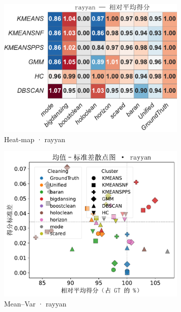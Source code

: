 \documentclass[10pt]{article} %
\numberwithin{equation}{section}
\begin{document}
\begin{figure}[htbp]
  \vspace{0.6em}
  \begin{subfigure}{0.33\linewidth}
    \centering
    \includegraphics[width=\linewidth]{figures/5.3.1graph/heatmap_rel_rayyan.pdf}
    \caption{Heat-map · rayyan}
  \end{subfigure}\hfill
  \begin{subfigure}{0.32\linewidth}
    \centering
    \includegraphics[width=\linewidth]{figures/5.3.1graph/mean_sd_scatter_rayyan.pdf}
    \caption{Mean–Var · rayyan}
  \end{subfigure}\hfill
  \begin{subfigure}{0.34\linewidth}

\end{subfigure}
\end{figure}
\end{document}
